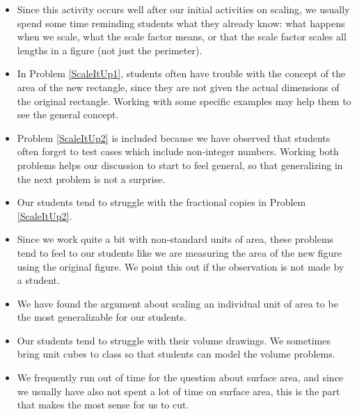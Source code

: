 \documentclass[nooutcomes]{ximera}
\begin{document}
\begin{instructorNotes}
\begin{itemize}
    \item Since this activity occurs well after our initial activities on scaling, we usually spend some time reminding students what they already know: what happens when we scale, what the scale factor means, or that the scale factor scales all lengths in a figure (not just the perimeter).
    \item In Problem \ref{ScaleItUp1}, students often have trouble with the concept of the area of the new rectangle, since they are not given the actual dimensions of the original rectangle. Working with some specific examples may help them to see the general concept.
    \item Problem \ref{ScaleItUp2} is included because we have observed that students often forget to test cases which include non-integer numbers.  Working both problems helps our discussion to start to feel general, so that generalizing in the next problem is not a surprise.
    \item Our students tend to struggle with the fractional copies in Problem \ref{ScaleItUp2}.
    \item Since we work quite a bit with non-standard units of area, these problems tend to feel to our students like we are measuring the area of the new figure using the original figure.  We point this out if the observation is not made by a student.
    \item We have found the argument about scaling an individual unit of area to be the most generalizable for our students.
    \item Our students tend to struggle with their volume drawings.  We sometimes bring unit cubes to class so that students can model the volume problems.
    \item We frequently run out of time for the question about surface area, and since we usually have also not spent a lot of time on surface area, this is the part that makes the most sense for us to cut.
\end{itemize}


\end{instructorNotes}
\end{document}

